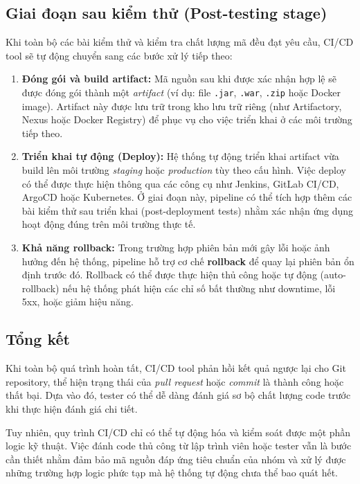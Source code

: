 \subsection*{Giai đoạn sau kiểm thử (Post-testing stage)}

Khi toàn bộ các bài kiểm thử và kiểm tra chất lượng mã đều đạt yêu cầu, CI/CD tool sẽ tự động chuyển sang các bước xử lý tiếp theo:

\begin{enumerate}
	\item \textbf{Đóng gói và build artifact:}  
	Mã nguồn sau khi được xác nhận hợp lệ sẽ được đóng gói thành một \textit{artifact} (ví dụ: file \texttt{.jar}, \texttt{.war}, \texttt{.zip} hoặc Docker image).  
	Artifact này được lưu trữ trong kho lưu trữ riêng (như Artifactory, Nexus hoặc Docker Registry) để phục vụ cho việc triển khai ở các môi trường tiếp theo.
	
	\item \textbf{Triển khai tự động (Deploy):}  
	Hệ thống tự động triển khai artifact vừa build lên môi trường \textit{staging} hoặc \textit{production} tùy theo cấu hình.  
	Việc deploy có thể được thực hiện thông qua các công cụ như Jenkins, GitLab CI/CD, ArgoCD hoặc Kubernetes.  
	Ở giai đoạn này, pipeline có thể tích hợp thêm các bài kiểm thử sau triển khai (post-deployment tests) nhằm xác nhận ứng dụng hoạt động đúng trên môi trường thực tế.

	
	\item \textbf{Khả năng rollback:}  
	Trong trường hợp phiên bản mới gây lỗi hoặc ảnh hưởng đến hệ thống, pipeline hỗ trợ cơ chế \textbf{rollback} để quay lại phiên bản ổn định trước đó.  
	Rollback có thể được thực hiện thủ công hoặc tự động (auto-rollback) nếu hệ thống phát hiện các chỉ số bất thường như downtime, lỗi 5xx, hoặc giảm hiệu năng.
\end{enumerate}

\subsection*{Tổng kết}

Khi toàn bộ quá trình hoàn tất, CI/CD tool phản hồi kết quả ngược lại cho Git repository, thể hiện trạng thái của \textit{pull request} hoặc \textit{commit} là thành công hoặc thất bại.  
Dựa vào đó, tester có thể dễ dàng đánh giá sơ bộ chất lượng code trước khi thực hiện đánh giá chi tiết.

Tuy nhiên, quy trình CI/CD chỉ có thể tự động hóa và kiểm soát được một phần logic kỹ thuật.  
Việc đánh code thủ công từ lập trình viên hoặc tester vẫn là bước cần thiết nhằm đảm bảo mã nguồn đáp ứng tiêu chuẩn của nhóm và xử lý được những trường hợp logic phức tạp mà hệ thống tự động chưa thể bao quát hết.

